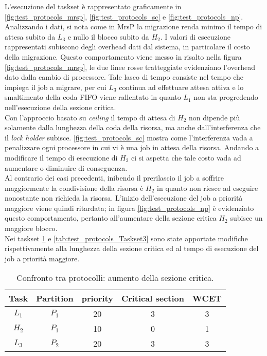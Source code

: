 \noindent L'esecuzione del taskset è rappresentato graficamente in \ref{fig:test_protocols_mrsp}, \ref{fig:test_protocols_sc} e \ref{fig:test_protocols_np}. Analizzando i dati, si nota come in MrsP la migrazione renda minimo il tempo di attesa subito da $L_3$ e nullo il blocco subito da $H_2$. I valori di esecuzione rappresentati subiscono degli overhead dati dal sistema, in particolare il costo della migrazione. Questo comportamento viene messo in risalto nella figura \ref{fig:test_protocols_mrsp}, le due linee rosse tratteggiate evidenziano l'overhead dato dalla cambio di processore. Tale lasco di tempo consiste nel tempo che impiega il job a migrare, per cui $L_3$ continua ad effettuare attesa attiva e lo smaltimento della coda FIFO viene rallentato in quanto $L_1$ non sta progredendo nell'esecuzione della sezione critica.\\
Con l'approccio basato su \textit{ceiling} il tempo di attesa di $H_2$ non dipende più solamente dalla lunghezza della coda della risorsa, ma anche dall'interferenza che il \textit{lock holder} subisce. \ref{fig:test_protocols_sc} mostra come l'interferenza vada a penalizzare ogni processore in cui vi è una job in attesa della risorsa. Andando a modificare il tempo di esecuzione di $H_2$ ci si aspetta che tale costo vada ad aumentare o diminuire di conseguenza.\\
Al contrario dei casi precedenti, inibendo il prerilascio il job a soffrire maggiormente la condivisione della risorsa è $H_2$ in quanto non riesce ad eseguire nonostante non richieda la risorsa. L'inizio dell'esecuzione del job a priorità maggiore viene quindi ritardata; in figura \ref{fig:test_protocols_np} è evidenziato questo comportamento, pertanto all'aumentare della sezione critica $H_2$ subisce un maggiore blocco.\\

\noindent Nei taskset  \ref{tab:test_protocols_Taskset2} e \ref{tab:test_protocols_Taskset3} sono state apportate modifiche rispettivamente alla lunghezza della sezione critica ed al tempo di esecuzione del job a priorità maggiore.\\

\begin{table}
  \centering
  \begin{tabular}{ccccc}
  \hline\hline
    Task & Partition     & priority & Critical section & WCET  \\ \hline
    $L_1$ & $P_1$  & 20 & 3 & 3 \\
    $H_2$ & $P_1$  & 10 & 0 & 1 \\
    $L_3$ & $P_2$  & 20 & 3 & 3 \\
    \hline
    \end{tabular}
  \caption{Confronto tra protocolli: aumento della sezione critica.}
  \label{tab:test_protocols_Taskset2}
  \end{table}

